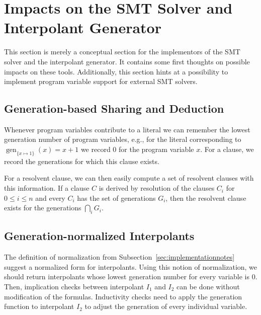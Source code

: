 \documentclass[a4paper,12pt]{article}
\newcommand\gen[1]{\mathop{gen}\nolimits_{#1}}
\begin{document}
\section{Impacts on the SMT Solver and Interpolant Generator}
This section is merely a conceptual section for the implementors of the SMT solver and the interpolant generator.
It contains some first thoughts on possible impacts on these tools.
Additionally, this section hints at a possibility to implement program variable support for external SMT solvers.

\subsection{Generation-based Sharing and Deduction}
Whenever program variables contribute to a literal we can remember the lowest generation number of program variables, e.g., for the literal corresponding to $\gen{\{x\mapsto 1\}}(x) = x + 1$ we record 0 for the program variable $x$.
For a clause, we record the generations for which this clause exists.

For a resolvent clause, we can then easily compute a set of resolvent clauses with this information.
If a clause $C$ is derived by resolution of the clauses $C_i$ for $0\le i\le n$ and every $C_i$ has the set of generations $G_i$, then the resolvent clause exists for the generations $\bigcap_i G_i$.

\subsection{Generation-normalized Interpolants}
The definition of normalization from Subsection~\ref{sec:implementationnotes} suggest a normalized form for interpolants.
Using this notion of normalization, we should return interpolants whose lowest generation number for every variable is 0.
Then, implication checks between interpolant $I_1$ and $I_2$ can be done without modification of the formulas.
Inductivity checks need to apply the generation function to interpolant $I_2$ to adjust the generation of every individual variable.
\end{document}
